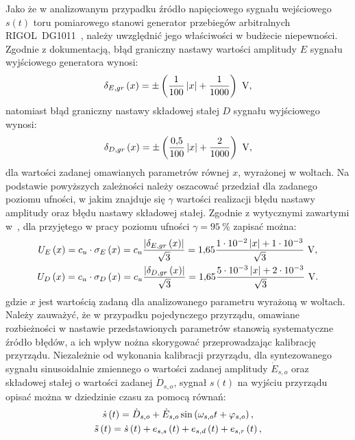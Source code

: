 Jako że w analizowanym przypadku źródło napięciowego sygnału wejściowego $s(t)$ toru pomiarowego stanowi generator przebiegów arbitralnych RIGOL~DG1011~\cite{rigol_fawg}, należy uwzględnić jego właściwości w budżecie niepewności. Zgodnie z dokumentacją, błąd graniczny nastawy wartości amplitudy $E$ sygnału wyjściowego generatora wynosi:
\begin{equation}
\delta_{E,gr} \emb{x} = \pm \emb{\frac{1}{100} \left| x \right| + \frac{1}{1000}} ~\unit{V} \label{eq:pom_gen_amperr_max},
\end{equation}
natomiast błąd graniczny nastawy składowej stałej $D$ sygnału wyjściowego wynosi:
\begin{equation}
\delta_{D,gr} \emb{x} = \pm \emb{\frac{\num{0.5}}{100} \left| x \right| + \frac{2}{1000}} ~\unit{V} \label{eq:pom_gen_shferr_max},
\end{equation}
dla wartości zadanej omawianych parametrów równej $x$, wyrażonej w woltach. Na podstawie powyższych zależności należy oszacować przedział dla zadanego poziomu ufności, w jakim znajduje się $\gamma$ wartości realizacji błędu nastawy amplitudy oraz błędu nastawy składowej stałej. Zgodnie z wytycznymi zawartymi w~\cite{jcgm_guide}, dla przyjętego w pracy poziomu ufności $\gamma = \qty{95}{\percent}$ zapisać można:
\begin{gather}
U_{E} \emb{x} = c_{u} \cdot \sigma_{E} \emb{x} = c_{u} \frac{\left| \delta_{E,gr} \emb{x} \right|}{\sqrt{3}} = \num{1.65} \frac{\num{1e-2} \left| x \right| + \num{1e-3}}{\sqrt{3}} ~\unit{V} \label{eq:pom_gen_amperr_unc}, \\
U_{D} \emb{x} = c_{u} \cdot \sigma_{D} \emb{x} = c_{u} \frac{\left| \delta_{D,gr} \emb{x} \right|}{\sqrt{3}} = \num{1.65} \frac{\num{5e-3} \left| x \right| + \num{2e-3}}{\sqrt{3}} ~\unit{V} \label{eq:pom_gen_shferr_unc}.
\end{gather}
gdzie $x$ jest wartością zadaną dla analizowanego parametru wyrażoną w woltach. Należy zauważyć, że w przypadku pojedynczego przyrządu, omawiane rozbieżności w nastawie przedstawionych parametrów stanowią systematyczne źródło błędów, a ich wpływ nożna skorygować przeprowadzając kalibrację przyrządu. Niezależnie od wykonania kalibracji przyrządu, dla syntezowanego sygnału sinusoidalnie zmiennego o wartości zadanej amplitudy $\dot{E}_{s,o}$ oraz składowej stałej o wartości zadanej $\dot{D}_{s,o}$, sygnał $s(t)$ na wyjściu przyrządu opisać można w dziedzinie czasu za pomocą równań:
\begin{gather}
\dot{s} \left(t\right) = \dot{D}_{s,o} + \dot{E}_{s,o} \sin \left(\omega_{s,o} t + \varphi_{s,o}\right) \label{eq:pom_gen_out_ideal}, \\
\tilde{s} \left(t\right) = \dot{s} \left(t\right) + e_{s,s} \left(t\right) + e_{s,d} \left(t\right) + e_{s,r} \left(t\right) \label{eq:pom_gen_out_real},
\end{gather}
